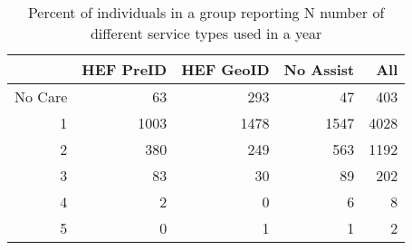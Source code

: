 \begin{table}[ht]
\centering
\begin{tabular}{rrrrr}
  \hline
 & HEF PreID & HEF GeoID & No Assist & All \\ 
  \hline
No Care &  63 & 293 &  47 & 403 \\ 
  1 & 1003 & 1478 & 1547 & 4028 \\ 
  2 & 380 & 249 & 563 & 1192 \\ 
  3 &  83 &  30 &  89 & 202 \\ 
  4 &   2 &   0 &   6 &   8 \\ 
  5 &   0 &   1 &   1 &   2 \\ 
   \hline
\end{tabular}
\caption{Percent of individuals in a group reporting N number of different service types used in a year} 
\end{table}
